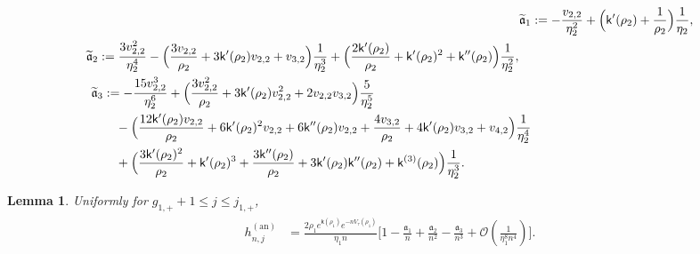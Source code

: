 \documentclass[a4paper]{article}
\newtheorem{lemma}[theorem]{Lemma}
\numberwithin{equation}{section}
\begin{document}
\begin{align}
\label{def of tilde frak a1}
\widetilde{\mathfrak{a}}_1&:=-\frac{v_{2,2}}{\eta_2^2}+\Bigl(\mathsf{k}'(\rho_2)+\frac{1}{\rho_2}\Bigr)\frac{1}{\eta_2}, 
\\
\begin{split}
\label{def of tilde frak a2}
\widetilde{\mathfrak{a}}_2&:=
\frac{3v_{2,2}^2}{\eta_2^4}
 -\Bigl(\frac{3v_{2,2}}{\rho_2}+3\mathsf{k}'(\rho_2)v_{2,2}+v_{3,2}\Bigr)\frac{1}{\eta_2^3}
 +\Bigl(\frac{2\mathsf{k}'(\rho_2)}{\rho_2}+\mathsf{k}'(\rho_2)^2+\mathsf{k}''(\rho_2)\Bigr)\frac{1}{\eta_2^2},
\end{split}
\\
\begin{split}
\label{def of tilde frak a3}
\widetilde{\mathfrak{a}}_3&:=
-\frac{15v_{2,2}^3}{\eta_2^6}+\Bigl(\frac{3v_{2,2}^2}{\rho_2}+3\mathsf{k}'(\rho_2)v_{2,2}^2+2v_{2,2}v_{3,2}\Bigr)\frac{5}{\eta_2^5}
 \\
 &\quad -\Bigl(\frac{12\mathsf{k}'(\rho_2)v_{2,2}}{\rho_2}+6\mathsf{k}'(\rho_2)^2v_{2,2}+6\mathsf{k}''(\rho_2)v_{2,2}+\frac{4v_{3,2}}{\rho_2}+4\mathsf{k}'(\rho_2)v_{3,2}+v_{4,2}\Bigr)\frac{1}{\eta_2^4}
 \\
 &\quad
 +\Bigl(\frac{3\mathsf{k}'(\rho_2)^2}{\rho_2}+\mathsf{k}'(\rho_2)^3+\frac{3\mathsf{k}''(\rho_2)}{\rho_2}+3\mathsf{k}'(\rho_2)\mathsf{k}''(\rho_2)+\mathsf{k}^{(3)}(\rho_2)\Bigr)\frac{1}{\eta_2^3}.
\end{split}
\end{align} 


\begin{lemma}\label{lemma: g1+leq j leq j+1}
Uniformly for $g_{1,+}+1\leq j\leq j_{1,+}$,
\begin{align}
\begin{split}
h_{n,j}^{(\mathrm{an})}
&=
\frac{2\rho_1e^{\mathsf{k}(\rho_1)}e^{-nV_{\tau}(\rho_1)}}{\eta_1 n}
\bigg[1-\frac{\mathfrak{a}_1}{n}+\frac{\mathfrak{a}_2}{n^2}-\frac{\mathfrak{a}_3}{n^3}+\mathcal{O}(\frac{1}{\eta_1^8n^4})\bigg].
\end{split}    
\end{align}
\end{lemma}
\end{document}
